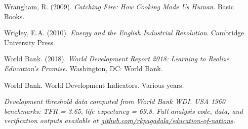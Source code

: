 \documentclass[12pt,letterpaper]{article}
\begin{document}
Wrangham, R. (2009). \emph{Catching Fire: How Cooking Made Us Human}.
Basic Books.

Wrigley, E.A. (2010). \emph{Energy and the English Industrial
Revolution}. Cambridge University Press.

World Bank. (2018). \emph{World Development Report 2018: Learning to
Realize Education's Promise}. Washington, DC: World Bank.

World Bank. World Development Indicators. Various years.

\emph{Development threshold data computed from World Bank WDI. USA 1960
benchmarks: TFR = 3.65, life expectancy = 69.8. Full analysis code,
data, and verification outputs available at
\href{https://github.com/rkpagadala/education-of-nations}{github.com/rkpagadala/education-of-nations}.}
\end{document}
